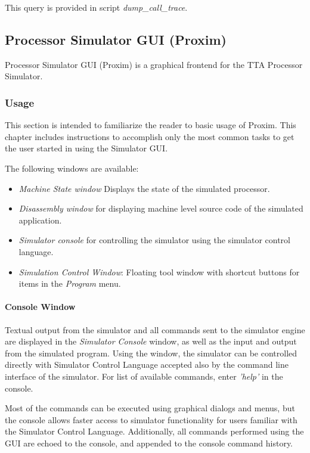 \documentclass[twoside]{tceusermanual}
\begin{document}
This query is provided in script \emph{dump\_call\_trace}.

\subsection{Processor Simulator GUI (Proxim)}
\label{section:proxim}

Processor Simulator GUI (Proxim) is a graphical frontend for 
the TTA Processor Simulator.

\subsubsection{Usage}

This section is intended to familiarize the reader to basic usage of 
Proxim. This chapter includes instructions to accomplish only the most
common tasks to get the user started in using the Simulator GUI.

The following windows are available:
\begin{itemize}
\item \emph{Machine State window} Displays the state of the simulated
processor. 
\item \emph{Disassembly window} for displaying machine level source
code of the simulated application. 
\item \emph{Simulator console} for controlling the simulator using
the simulator control language. 

\item \emph{Simulation Control Window}: Floating tool window with shortcut
buttons for items in the \emph{Program} menu.
\end{itemize}

\paragraph{Console Window}

Textual output from the simulator and all commands sent to the simulator
engine are displayed in the \emph{Simulator Console} window, as well as the
input and output from the simulated program. Using the window,
the simulator can be controlled directly with Simulator Control Language
accepted also by the command line interface of the simulator. For list of
available commands, enter \emph{'help'} in the console.

Most of the commands can be executed using graphical dialogs and
menus, but the console allows faster access to simulator functionality for
users familiar with the Simulator Control Language. Additionally, all commands
performed using the GUI are echoed to the console, and appended to the
console command history.
\end{document}
